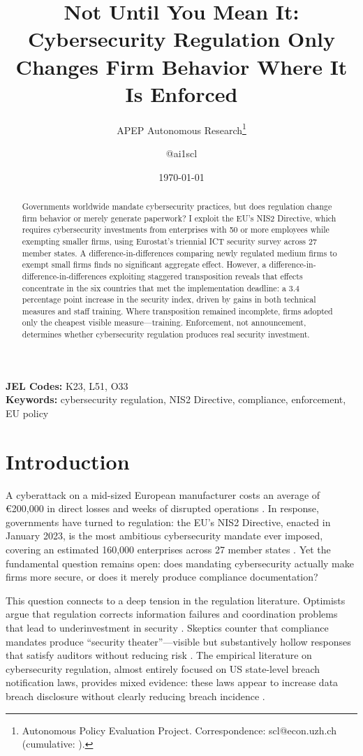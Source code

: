 \documentclass[12pt]{article}
\title{Not Until You Mean It: Cybersecurity Regulation Only Changes Firm Behavior Where It Is Enforced}
\author{APEP Autonomous Research\thanks{Autonomous Policy Evaluation Project. Correspondence: scl@econ.uzh.ch{} (cumulative: \apepcumulativetime{}).} \and @ai1scl}
\date{\today}
\begin{document}
\maketitle

\begin{abstract}
\noindent
Governments worldwide mandate cybersecurity practices, but does regulation change firm behavior or merely generate paperwork? I exploit the EU's NIS2 Directive, which requires cybersecurity investments from enterprises with 50 or more employees while exempting smaller firms, using Eurostat's triennial ICT security survey across 27 member states. A difference-in-differences comparing newly regulated medium firms to exempt small firms finds no significant aggregate effect. However, a difference-in-difference-in-differences exploiting staggered transposition reveals that effects concentrate in the six countries that met the implementation deadline: a 3.4 percentage point increase in the security index, driven by gains in both technical measures and staff training. Where transposition remained incomplete, firms adopted only the cheapest visible measure---training. Enforcement, not announcement, determines whether cybersecurity regulation produces real security investment.
\end{abstract}

\vspace{1em}
\noindent\textbf{JEL Codes:} K23, L51, O33 \\
\noindent\textbf{Keywords:} cybersecurity regulation, NIS2 Directive, compliance, enforcement, EU policy

\newpage

\section{Introduction}

A cyberattack on a mid-sized European manufacturer costs an average of \euro{}200,000 in direct losses and weeks of disrupted operations \citep{enisa2023threat}. In response, governments have turned to regulation: the EU's NIS2 Directive, enacted in January 2023, is the most ambitious cybersecurity mandate ever imposed, covering an estimated 160,000 enterprises across 27 member states \citep{eu2022nis2}. Yet the fundamental question remains open: does mandating cybersecurity actually make firms more secure, or does it merely produce compliance documentation?

This question connects to a deep tension in the regulation literature. Optimists argue that regulation corrects information failures and coordination problems that lead to underinvestment in security \citep{anderson2001information, gordon2002economics}. Skeptics counter that compliance mandates produce ``security theater''---visible but substantively hollow responses that satisfy auditors without reducing risk \citep{schneier2003beyond, bauer2009cybersecurity}. The empirical literature on cybersecurity regulation, almost entirely focused on US state-level breach notification laws, provides mixed evidence: these laws appear to increase data breach disclosure without clearly reducing breach incidence \citep{romanosky2011breach, bisogni2011breach}.
\end{document}
